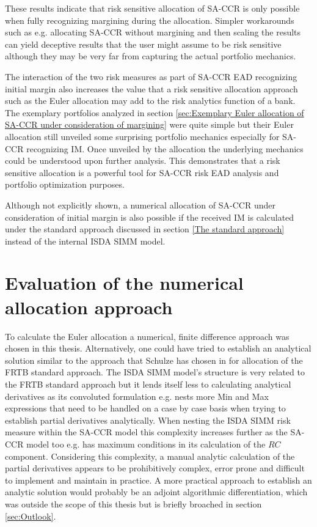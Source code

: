 \documentclass[../Thesis_AHoecherl.tex]{subfiles}
\begin{document}
    These results indicate that risk sensitive allocation of \gls{SA-CCR} is only possible when fully recognizing margining during the allocation. Simpler workarounds such as e.g. allocating \gls{SA-CCR} without margining and then scaling the results can yield deceptive results that the user might assume to be risk sensitive although they may be very far from capturing the actual portfolio mechanics.
    
    The interaction of the two risk measures as part of \gls{SA-CCR} \gls{EAD} recognizing initial margin also increases the value that a risk sensitive allocation approach such as the Euler allocation may add to the risk analytics function of a bank.
    The exemplary portfolios analyzed in section \ref{sec:Exemplary Euler allocation of SA-CCR under consideration of margining} were quite simple but their Euler allocation still unveiled some surprising portfolio mechanics especially for \gls{SA-CCR} recognizing IM.
    Once unveiled by the allocation the underlying mechanics could be understood upon further analysis. This demonstrates that a risk sensitive allocation is a powerful tool for \gls{SA-CCR} risk \gls{EAD} analysis and portfolio optimization purposes.

    Although not explicitly shown, a numerical allocation of \gls{SA-CCR} under consideration of initial margin is also possible if the received \gls{IM} is calculated under the standard approach discussed in section \ref{The standard approach} instead of the internal \gls{ISDA SIMM} model. 

    \section{Evaluation of the numerical allocation approach\label{Evaluation of the numerical allocation approach}}

    To calculate the Euler allocation a numerical, finite difference approach was chosen in this thesis. Alternatively, one could have tried to establish an analytical solution similar to the approach that Schulze has chosen in \cite{schulze2018capital} for allocation of the FRTB standard approach.
    The \gls{ISDA SIMM} model's structure is very related to the FRTB standard approach but it lends itself less to calculating analytical derivatives as its convoluted formulation e.g. nests more Min and Max expressions that need to be handled on a case by case basis when trying to establish partial derivatives analytically.
    When nesting the \gls{ISDA SIMM} risk measure within the \gls{SA-CCR} model this complexity increases further as the \gls{SA-CCR} model too e.g. has maximum conditions in its calculation of the $RC$ component.
    Considering this complexity, a manual analytic calculation of the partial derivatives appears to be prohibitively complex, error prone and difficult to implement and maintain in practice.
    A more practical approach to establish an analytic solution would probably be an adjoint algorithmic differentiation, which was outside the scope of this thesis but is briefly broached in section \ref{sec:Outlook}.
\end{document}
